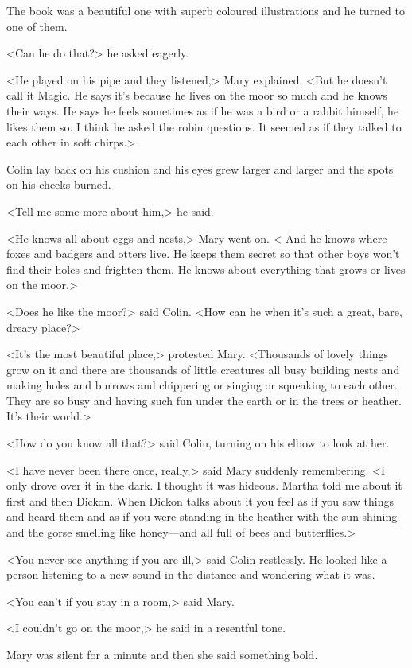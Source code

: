 The book was a beautiful one with superb coloured illustrations and he turned to one of them.

<Can he do that?> he asked eagerly.

<He played on his pipe and they listened,> Mary explained. <But he doesn't call it Magic. He says it's because he lives on the moor so much and he knows their ways. He says he feels sometimes as if he was a bird or a rabbit himself, he likes them so. I think he asked the robin questions. It seemed as if they talked to each other in soft chirps.>

Colin lay back on his cushion and his eyes grew larger and larger and the spots on his cheeks burned.

<Tell me some more about him,> he said.

<He knows all about eggs and nests,> Mary went on. < And he knows where foxes and badgers and otters live. He keeps them secret so that other boys won't find their holes and frighten them. He knows about everything that grows or lives on the moor.>

<Does he like the moor?> said Colin. <How can he when it's such a great, bare, dreary place?>

<It's the most beautiful place,> protested Mary. <Thousands of lovely things grow on it and there are thousands of little creatures all busy building nests and making holes and burrows and chippering or singing or squeaking to each other. They are so busy and having such fun under the earth or in the trees or heather. It's their world.>

<How do you know all that?> said Colin, turning on his elbow to look at her.

<I have never been there once, really,> said Mary suddenly remembering. <I only drove over it in the dark. I thought it was hideous. Martha told me about it first and then Dickon. When Dickon talks about it you feel as if you saw things and heard them and as if you were standing in the heather with the sun shining and the gorse smelling like honey—and all full of bees and butterflies.>

<You never see anything if you are ill,> said Colin restlessly. He looked like a person listening to a new sound in the distance and wondering what it was.

<You can't if you stay in a room,> said Mary.

<I couldn't go on the moor,> he said in a resentful tone.

Mary was silent for a minute and then she said something bold.

